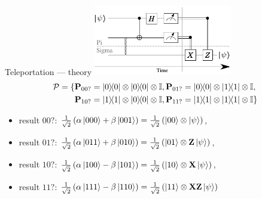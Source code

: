 \begin{frame}{Teleportation --- theory}
    \includegraphics[width=0.45\textwidth]{pics/teleportation/teleportation_t3}
    \centering
\begin{equation*}
\begin{split}
\mathcal{P} = \{&\mathbf{P}_{00?}=\ketbra{0}{0}\otimes\ketbra{0}{0}\otimes\mathbb{I}, \mathbf{P}_{01?}=\ketbra{0}{0}\otimes\ketbra{1}{1}\otimes\mathbb{I}, \\
&\mathbf{P}_{10?}=\ketbra{1}{1}\otimes\ketbra{0}{0}\otimes\mathbb{I}, \mathbf{P}_{11?}=\ketbra{1}{1}\otimes\ketbra{1}{1}\otimes\mathbb{I}\}
\end{split}
\end{equation*}
\begin{itemize}
	\item result $00?$: $\frac{1}{\sqrt{2}}\left(\alpha \ket{000}  + \beta \ket{001}\right) = \frac{1}{\sqrt{2}}\left(\ket{00}\otimes \ket{\psi}\right)$,
	\item result $01?$: $\frac{1}{\sqrt{2}}\left(\alpha \ket{011}  + \beta \ket{010}\right) = \frac{1}{\sqrt{2}}\left(\ket{01}\otimes \mathbf{Z}\ket{\psi}\right)$,
	\item result $10?$: $\frac{1}{\sqrt{2}}\left(\alpha \ket{100}  - \beta \ket{101}\right) = \frac{1}{\sqrt{2}}\left(\ket{10}\otimes \mathbf{X}\ket{\psi}\right)$,
	\item result $11?$: $\frac{1}{\sqrt{2}}\left(\alpha \ket{111}  - \beta \ket{110}\right) = \frac{1}{\sqrt{2}}\left(\ket{11}\otimes \mathbf{X}\mathbf{Z}\ket{\psi}\right)$
\end{itemize}
\end{frame}



